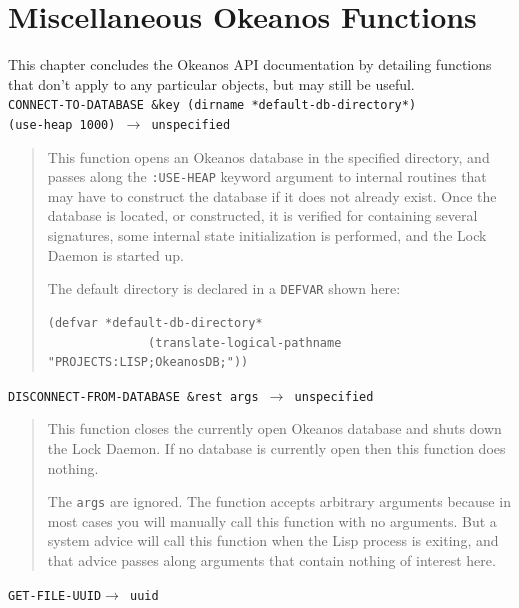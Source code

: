 \documentclass[article,oneside]{memoir}
\begin{document}
\chapter{Miscellaneous Okeanos Functions}
This chapter concludes the Okeanos API documentation by detailing functions that don't apply to any particular objects, but may still be useful.
\\

\noindent \texttt{CONNECT-TO-DATABASE \&key (dirname *default-db-directory*) \\
\hspace*{8.5em} (use-heap 1000) \hspace*{7em} $\rightarrow$ unspecified}

\begin{quote}
This function opens an Okeanos database in the specified directory, and passes along the \texttt{:USE-HEAP} keyword argument to internal routines that may have to construct the database if it does not already exist. Once the database is located, or constructed, it is verified for containing several signatures, some internal state initialization is performed, and the Lock Daemon is started up.

The default directory is declared in a \texttt{DEFVAR} shown here:
\begin{verbatim}
(defvar *default-db-directory* 
              (translate-logical-pathname "PROJECTS:LISP;OkeanosDB;"))
\end{verbatim}
\end{quote}

\noindent \texttt{DISCONNECT-FROM-DATABASE \&rest args $\rightarrow$ unspecified}

\begin{quote}

This function closes the currently open Okeanos database and shuts down the Lock Daemon. If no database is currently open then this function does nothing.

The \texttt{args} are ignored. The function accepts arbitrary arguments because in most cases you will manually call this function with no arguments. But a system advice will call this function when the Lisp process is exiting, and that advice passes along arguments that contain nothing of interest here.
\end{quote}


\noindent \texttt{GET-FILE-UUID$\rightarrow$ uuid}
\end{document}
